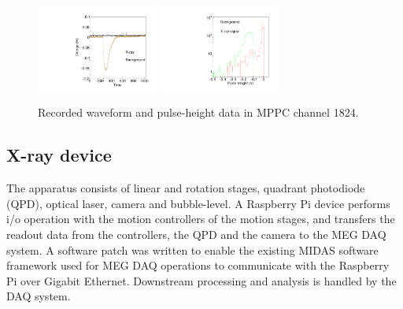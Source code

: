\begin{figure}[]
\includegraphics[width=4cm]{plots/mppc1824_waveforms.pdf}
\includegraphics[width=4cm]{plots/pulseheight}
\caption{Recorded waveform and pulse-height data in MPPC channel
  1824.}
\label{fig:pulseheight}
\end{figure}  


\subsection{X-ray device}
The apparatus consists of linear and rotation stages, quadrant photodiode
(QPD), optical laser, camera and bubble-level. A Raspberry Pi device
performs i/o operation with the motion controllers of the motion
stages, and transfers the readout data from the controllers, the QPD
and the camera to the MEG DAQ system.  A software patch was written to
enable the existing MIDAS software framework used for MEG DAQ
operations to communicate with the Raspberry Pi over Gigabit Ethernet.
Downstream processing and analysis is handled by the DAQ system.
 

